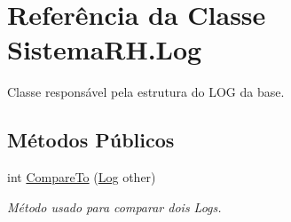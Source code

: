 \hypertarget{class_sistema_r_h_1_1_log}{
\section{Referência da Classe SistemaRH.Log}
\label{class_sistema_r_h_1_1_log}
}


Classe responsável pela estrutura do LOG da base.  


\subsection*{Métodos Públicos}
\begin{DoxyCompactItemize}
\item 
int \hyperlink{class_sistema_r_h_1_1_log_a75d4a78eb8da8071981fa6f2f7f1f69a}{CompareTo} (\hyperlink{class_sistema_r_h_1_1_log}{Log} other)
\begin{DoxyCompactList}\small\item\em Método usado para comparar dois Logs. \item\end{DoxyCompactList}\end{DoxyCompactItemize}
